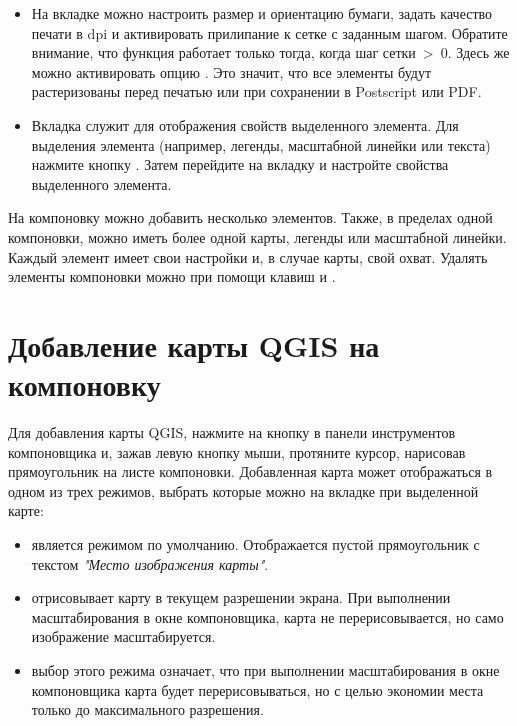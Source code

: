 \begin{itemize}[label=--]
\item На вкладке  можно настроить размер и ориентацию бумаги,
задать качество печати в dpi и активировать прилипание к сетке с заданным
шагом. Обратите внимание, что функция 
работает только тогда, когда шаг сетки~>~0. Здесь же можно активировать
опцию . Это значит, что все элементы будут
растеризованы перед печатью или при сохранении в Postscript или PDF.
\item Вкладка  служит для отображения свойств выделенного
элемента. Для выделения элемента (например, легенды, масштабной линейки
или текста) нажмите кнопку . Затем перейдите на вкладку  и настройте свойства
выделенного элемента.
\end{itemize}

На компоновку можно добавить несколько элементов. Также, в пределах
одной компоновки, можно иметь более одной карты, легенды или масштабной
линейки. Каждый элемент имеет свои настройки и, в случае карты, свой
охват. Удалять элементы компоновки можно при помощи клавиш 
и .

\section{Добавление карты QGIS на компоновку}

Для добавления карты QGIS, нажмите на кнопку
 в панели инструментов
компоновщика и, зажав левую кнопку мыши, протяните курсор, нарисовав
прямоугольник на листе компоновки. Добавленная карта может отображаться
в одном из трех режимов, выбрать которые можно на вкладке 
при выделенной карте:

\begin{itemize}[label=--]
\item {} является режимом по
умолчанию. Отображается пустой прямоугольник с текстом
\textit{"Место изображения карты"}.
\item {} отрисовывает карту в текущем
разрешении экрана. При выполнении масштабирования в окне компоновщика,
карта не перерисовывается, но само изображение масштабируется.
\item {} выбор этого режима
означает, что при выполнении масштабирования в окне компоновщика карта
будет перерисовываться, но с целью экономии места только до
максимального разрешения.
\end{itemize}

